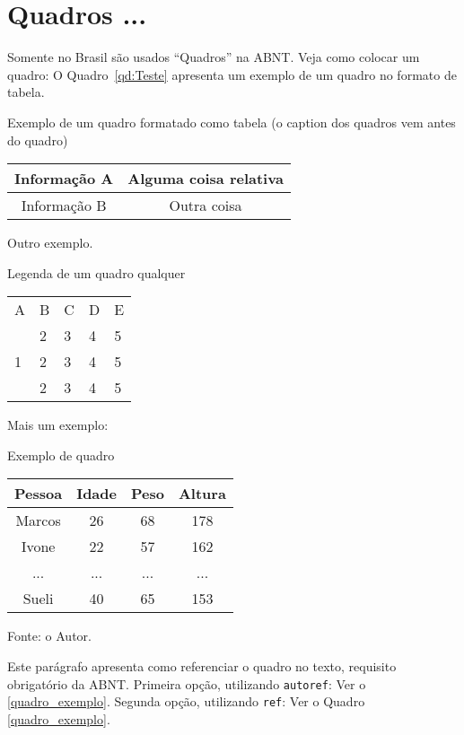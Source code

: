 \section{Quadros ...}

Somente no Brasil são usados ``Quadros'' na ABNT.
Veja como colocar um quadro: 
O Quadro~\ref{qd:Teste} apresenta um exemplo de um quadro no formato de tabela.
\begin{quadro}[h]
  \caption{Exemplo de um quadro formatado como tabela (o caption dos quadros vem antes do quadro)}
\begin{center}
  \begin{tabular}{|c|c|} \hline
     Informação A & Alguma coisa relativa \\ \hline
     Informação B & Outra coisa \\ \hline
  \end{tabular}
\end{center}
\label{qd:Teste}
\end{quadro}

Outro exemplo.

\begin{quadro}[h]
\caption{Legenda de um quadro qualquer}
\label{quad:primeiro_quadro}
\centering
\begin{tabular}{|lllll|}
\cline{1-5}
A& B & C& D &E \\ \cline{1-5}
\multirow{3}{*}{1} & 2 & 3& 4& 5 \\
& 2 & 3& 4& 5 \\
& 2 & 3& 4& 5 \\
\cline{1-5}
\end{tabular}
\end{quadro}

Mais um exemplo:

\begin{quadro}[htb]
\caption{\label{quadro_exemplo}Exemplo de quadro}
\begin{center}
\begin{tabular}{|c|c|c|c|}
	\hline
	\textbf{Pessoa} & \textbf{Idade} & \textbf{Peso} & \textbf{Altura} \\ \hline
	Marcos & 26    & 68   & 178    \\ \hline
	Ivone  & 22    & 57   & 162    \\ \hline
	...    & ...   & ...  & ...    \\ \hline
	Sueli  & 40    & 65   & 153    \\ \hline
\end{tabular}\par 
Fonte: o Autor.
\end{center}
\end{quadro}

Este parágrafo apresenta como referenciar o quadro no texto, requisito
obrigatório da ABNT. 
Primeira opção, utilizando \texttt{autoref}: Ver o \autoref{quadro_exemplo}. 
Segunda opção, utilizando  \texttt{ref}: Ver o Quadro \ref{quadro_exemplo}.